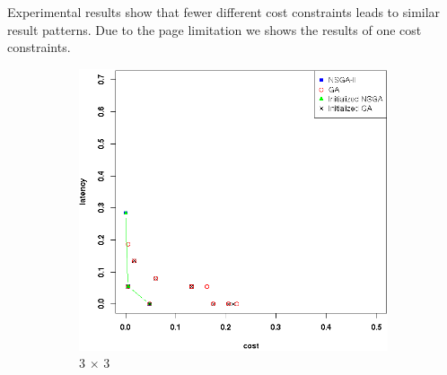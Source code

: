 \documentclass{llncs}
\begin{document}
Experimental results show that fewer different cost constraints leads to similar result patterns. Due to the page limitation we shows the results of one cost constraints.




\begin{figure}[H]
	\centering
	\begin{subfigure}[b]{0.45\textwidth}
		\includegraphics[width=\textwidth]{pics/pop_50_gen_50_3_times_3_sufficient_initialisation.png}
		\caption{3 $\times$ 3}
	\end{subfigure}%
	\begin{subfigure}[b]{0.45\textwidth}

\end{subfigure}
\end{figure}
\end{document}
